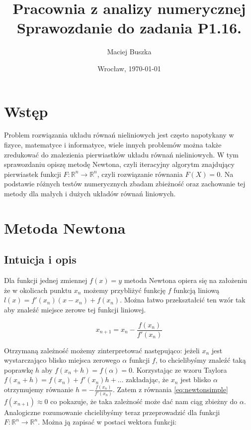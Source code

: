 \documentclass[11pt,wide]{mwart}
\date{Wrocław, \today}
\title{\LARGE\textbf{Pracownia z analizy numerycznej}
  \\Sprawozdanie do zadania \textbf{P1.16.}}
\author{Maciej Buszka}
\begin{document}
\maketitle

\section{Wstęp}

Problem rozwiązania układu równań nieliniowych jest często napotykany w fizyce, matematyce i informatyce, wiele innych problemów można także zredukować do znalezienia pierwiastków układu równań nieliniowych. W tym sprawozdaniu opiszę metodę Newtona, czyli iteracyjny algorytm znajdujący pierwiastek funkcji $ F : \mathbb{R}^n \rightarrow \mathbb{R}^n $, czyli rozwiązanie równania $ F(X) = 0 $. Na podstawie różnych testów numerycznych zbadam zbieżność oraz zachowanie tej metody dla małych i dużych układów równań liniowych.
\section{Metoda Newtona}
\subsection{Intuicja i opis}

Dla funkcji jednej zmiennej $ f(x) = y $ metoda Newtona opiera się na założeniu że w okolicach punktu $ x_n $ możemy przybliżyć funkcję $ f $ funkcją liniową $ l(x) = f'(x_n)(x - x_n) + f(x_n) $. Można łatwo przekształcić ten wzór tak aby znaleźć miejsce zerowe tej funkcji liniowej.

\begin{equation} \label{eq:newtonsimple}
		x_{n+1} = x_n - \frac{f(x_n)}{f'(x_n)}
\end{equation}

Otrzymaną zależność możemy zinterpretować następująco: jeżeli $ x_n $ jest wystarczająco blisko miejsca zerowego $ \alpha $ funkcji $ f $, to chcielibyśmy znaleźć taką poprawkę $ h $ aby $ f(x_n + h) = f(\alpha) = 0 $. Korzystając ze wzoru Taylora $ f(x_n + h) = f(x_n) + f'(x_n)h + \dots $ zakładając, że $ x_n $ jest blisko $ \alpha $ otrzymujemy równanie $ h = -\frac{f(x_n)}{f'(x_n)} $. Zatem z równania \eqref{eq:newtonsimple} $ f(x_{n+1}) \approx 0 $ co pokazuje, że taka zależność może dać nam ciąg zbieżny do $ \alpha $.\\
 
Analogiczne rozumowanie chcielibyśmy teraz przeprowadzić dla funkcji $ F : \mathbb{R}^n \to \mathbb{R}^n $. Można ją zapisać w postaci wektora funkcji:
\end{document}
